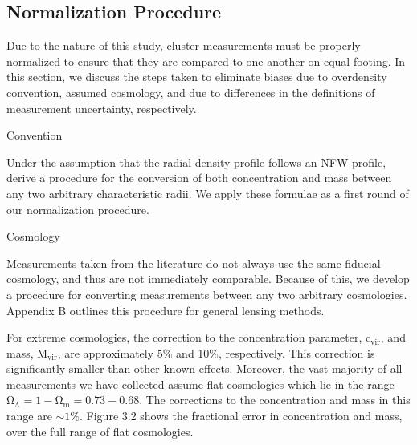 \subsection{Normalization Procedure}

Due to the nature of this study, cluster measurements must be properly
normalized to ensure that they are compared to one another on equal footing. In
this section, we discuss the steps taken to eliminate biases due to overdensity
convention, assumed cosmology, and due to differences in the definitions of
measurement uncertainty, respectively. 

\centerline{{\large Convention}}
Under the assumption that the radial density profile follows an NFW profile,
\citet{HK03.1} derive a procedure for the conversion of both concentration and
mass between any two arbitrary characteristic radii. We apply these 
formulae as a first round of our normalization procedure.
\centerline{{\large Cosmology}}
Measurements taken from the literature do not always use the same
fiducial cosmology, and thus are not immediately comparable. Because of this,
we develop a procedure for converting measurements between any two arbitrary
cosmologies. Appendix B outlines this procedure for general lensing methods.

For extreme cosmologies, the correction to the concentration parameter,
$\mathrm{c_{vir}}$, and mass, $\mathrm{M_{vir}}$, are approximately 5$\%$ and
10$\%$, respectively. This correction is significantly smaller than other known
effects. Moreover, the vast majority of all measurements we have collected
assume flat cosmologies which lie in the range $\mathrm{\Omega_{\Lambda} = 1 -
  \Omega_{m}  = 0.73 - 0.68}$. The corrections to the concentration and mass in
this range are $\mathrm{\sim 1\%}$. Figure 3.2 shows the fractional error in
concentration and mass, over the full range of flat cosmologies. 

